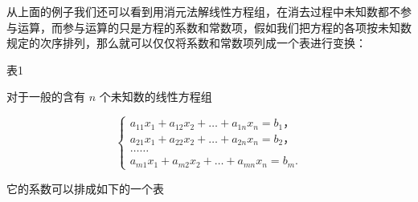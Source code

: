 从上面的例子我们还可以看到用消元法解线性方程组，在消去过程中未知数都不参与运算，而参与运算的只是方程的系数和常数项，假如我们把方程的各项按未知数规定的次序排列，那么就可以仅仅将系数和常数项列成一个表进行变换：

表1

{\centering
\small\setlength{\tabcolsep}{3pt}%
\par
}

对于一般的含有 \(n\) 个未知数的线性方程组

\[
\left\{ \begin{array}{l} a _ {11} x _ {1} + a _ {12} x _ {2} + \dots + a _ {1 n} x _ {n} = b _ {1}\text{，} \\ a _ {21} x _ {1} + a _ {22} x _ {2} + \dots + a _ {2 n} x _ {n} = b _ {2}\text{，} \\ \dots \dots \\ a _ {m 1} x _ {1} + a _ {m 2} x _ {2} + \dots + a _ {m n} x _ {n} = b _ {m}. \end{array} \right. \tag {1}
\]

它的系数可以排成如下的一个表

